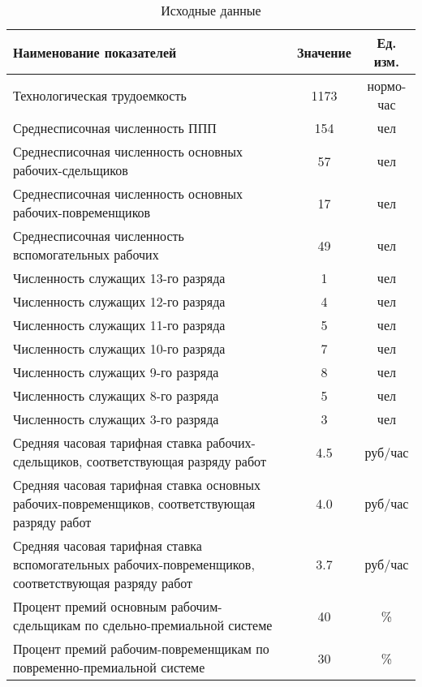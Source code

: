 \begin{table}
	\caption{Исходные данные}
	\begin{tabular}{|p{11cm}|c|c|}
		\hline
		Наименование показателей & Значение & Ед. изм. \\ \hline
		Технологическая трудоемкость & 1173 & нормо-час \\ \hline
		Среднесписочная численность ППП & 154 & чел \\ \hline
		Среднесписочная численность основных рабочих-сдельщиков & 57 & чел \\ \hline
		Среднесписочная численность основных рабочих-повременщиков & 17 & чел \\ \hline
		Среднесписочная численность вспомогательных рабочих & 49 & чел \\ \hline		
		Численность служащих 13-го разряда & 1 & чел \\ \hline
		Численность служащих 12-го разряда & 4 & чел \\ \hline		
		Численность служащих 11-го разряда & 5 & чел \\ \hline		
		Численность служащих 10-го разряда & 7 & чел \\ \hline		
		Численность служащих 9-го разряда & 8 & чел \\ \hline		
		Численность служащих 8-го разряда & 5 & чел \\ \hline		
		Численность служащих 3-го разряда & 3 & чел \\ \hline		
		Средняя часовая тарифная ставка рабочих-сдельщиков, соответствующая разряду работ & 4.5 & руб/час \\ \hline
		Средняя часовая тарифная ставка основных рабочих-повременщиков, соответствующая разряду работ & 4.0 & руб/час \\ \hline
		Средняя часовая тарифная ставка вспомогательных рабочих-повременщиков, соответствующая разряду работ & 3.7 & руб/час \\ \hline
		Процент премий основным рабочим-сдельщикам по сдельно-премиальной системе & 40 & \% \\ \hline
		Процент премий рабочим-повременщикам по повременно-премиальной системе & 30 & \% \\ \hline 
		
	\end{tabular}
\end{table}